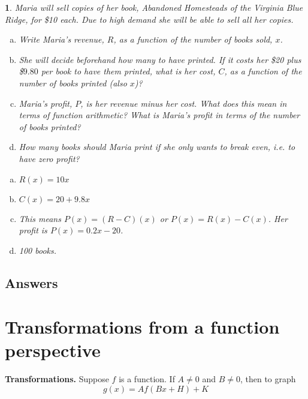 \documentclass{amsbook}
\newcommand{\ssp}{\begin{enumerate}[(a), leftmargin=*]}
\newcommand{\esp}{\end{enumerate}}
\newtheorem{exc}{}
\newenvironment{ex}{\begin{exc}\normalfont}{\end{exc}}
\numberwithin{section}{chapter}
\numberwithin{equation}{chapter}
\begin{document}
\begin{ex}
	Maria will sell copies of her book, \textit{Abandoned Homesteads of the Virginia Blue Ridge}, for \$10 each. Due to high demand she will be able to sell all her copies.
	\ssp
	\item Write Maria's revenue, $R$, as a function of the number of books sold, $x$.
	\item She will decide beforehand how many to have printed. If it costs her \$20 plus \$$9.80$ per book to have them printed, what is her cost, $C$, as a function of the number of books printed (also $x$)?
	\item Maria's profit, $P$, is her revenue minus her cost. What does this mean in terms of function arithmetic? What is Maria's profit in terms of the number of books printed?
	\item How many books should Maria print if she only wants to break even, i.e. to have zero profit?
	\esp
	\begin{sol}
		\ssp
		\item $R(x) = 10x$
		\item $C(x) = 20+9.8x$
		\item This means $P(x) = (R-C)(x)$ or $P(x) = R(x)-C(x)$. Her profit is $P(x) = 0.2x-20$.
		\item 100 books.
		\esp
	\end{sol}
\end{ex}


\subsection*{Answers \nopunct} \hfill
\begin{multicols}{2}
	
\end{multicols}






\newpage
\section{Transformations from a function perspective}

\label{transformationsthm}\textbf{Transformations.}  Suppose $f$ is a function.  If $A \neq 0$ and $B \neq 0$, then to graph \[g(x) = A f(Bx+H)+K\] 
	
\end{document}
